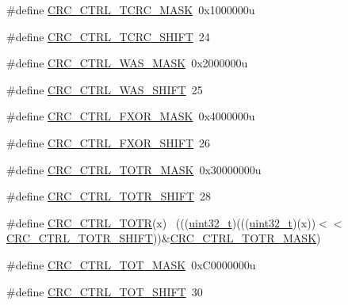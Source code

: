 \begin{DoxyCompactItemize}
\item 
\#define \hyperlink{group___c_r_c___register___masks_gad441a2b8f6300b71038d47cc3c8c0fcc}{C\+R\+C\+\_\+\+C\+T\+R\+L\+\_\+\+T\+C\+R\+C\+\_\+\+M\+A\+SK}~0x1000000u
\item 
\#define \hyperlink{group___c_r_c___register___masks_ga7c3cc17a7bc8f6c0621f3ce91e7b2b3e}{C\+R\+C\+\_\+\+C\+T\+R\+L\+\_\+\+T\+C\+R\+C\+\_\+\+S\+H\+I\+FT}~24
\item 
\#define \hyperlink{group___c_r_c___register___masks_gaf3955c626d1b33289184fdc8a8a09147}{C\+R\+C\+\_\+\+C\+T\+R\+L\+\_\+\+W\+A\+S\+\_\+\+M\+A\+SK}~0x2000000u
\item 
\#define \hyperlink{group___c_r_c___register___masks_gaf0d0849f057da668b51b759b7a2ba70f}{C\+R\+C\+\_\+\+C\+T\+R\+L\+\_\+\+W\+A\+S\+\_\+\+S\+H\+I\+FT}~25
\item 
\#define \hyperlink{group___c_r_c___register___masks_ga7c59a3459d15bbbf8ae8bbcc208a1b31}{C\+R\+C\+\_\+\+C\+T\+R\+L\+\_\+\+F\+X\+O\+R\+\_\+\+M\+A\+SK}~0x4000000u
\item 
\#define \hyperlink{group___c_r_c___register___masks_ga99bb491c03e22125b5053167bf361218}{C\+R\+C\+\_\+\+C\+T\+R\+L\+\_\+\+F\+X\+O\+R\+\_\+\+S\+H\+I\+FT}~26
\item 
\#define \hyperlink{group___c_r_c___register___masks_ga1af35cbb29862b18aee64fd4f32bca07}{C\+R\+C\+\_\+\+C\+T\+R\+L\+\_\+\+T\+O\+T\+R\+\_\+\+M\+A\+SK}~0x30000000u
\item 
\#define \hyperlink{group___c_r_c___register___masks_gab309d177a917d972212c78481cf25d4d}{C\+R\+C\+\_\+\+C\+T\+R\+L\+\_\+\+T\+O\+T\+R\+\_\+\+S\+H\+I\+FT}~28
\item 
\#define \hyperlink{group___c_r_c___register___masks_gad9b6420cda76f25cebee4315a10317e6}{C\+R\+C\+\_\+\+C\+T\+R\+L\+\_\+\+T\+O\+TR}(x)                                              ~(((\hyperlink{_p_e___types_8h_a33594304e786b158f3fb30289278f5af}{uint32\+\_\+t})(((\hyperlink{_p_e___types_8h_a33594304e786b158f3fb30289278f5af}{uint32\+\_\+t})(x))$<$$<$\hyperlink{group___c_r_c___register___masks_gab309d177a917d972212c78481cf25d4d}{C\+R\+C\+\_\+\+C\+T\+R\+L\+\_\+\+T\+O\+T\+R\+\_\+\+S\+H\+I\+FT}))\&\hyperlink{group___c_r_c___register___masks_ga1af35cbb29862b18aee64fd4f32bca07}{C\+R\+C\+\_\+\+C\+T\+R\+L\+\_\+\+T\+O\+T\+R\+\_\+\+M\+A\+SK})
\item 
\#define \hyperlink{group___c_r_c___register___masks_ga66da08ca8e22cd72c74e4b3cf53df7dd}{C\+R\+C\+\_\+\+C\+T\+R\+L\+\_\+\+T\+O\+T\+\_\+\+M\+A\+SK}~0x\+C0000000u
\item 
\#define \hyperlink{group___c_r_c___register___masks_gaad1005ea5864ca6795a27b3f7db38ea6}{C\+R\+C\+\_\+\+C\+T\+R\+L\+\_\+\+T\+O\+T\+\_\+\+S\+H\+I\+FT}~30
$$
\end{DoxyCompactItemize}
